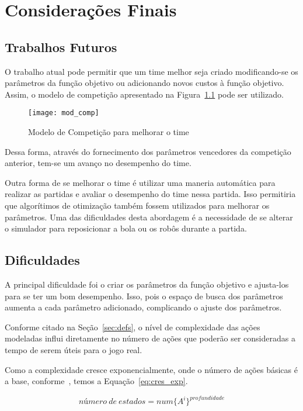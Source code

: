 \chapter{Considerações Finais}\label{cap:cons_finais}

\section{Trabalhos Futuros}

O trabalho atual pode permitir que um time melhor seja criado modificando-se os
parâmetros da função objetivo ou adicionando novos custos à função objetivo.
Assim, o modelo de competição apresentado na Figura~\ref{fig:mod_comp} pode ser
utilizado.

\begin{figure}[H]
  \centering
  \texttt{[image: mod\_comp]}
  \caption{Modelo de Competição para melhorar
           o time}\label{fig:mod_comp}
\end{figure}

Dessa forma, através do fornecimento dos parâmetros vencedores da competição
anterior, tem-se um avanço no desempenho do time.

Outra forma de se melhorar o time é utilizar uma maneria automática para
realizar as partidas e avaliar o desempenho do time nessa partida. Isso
permitiria que algorítimos de otimização também fossem utilizados para melhorar
os parâmetros.  Uma das dificuldades desta abordagem é a necessidade de se
alterar o simulador para reposicionar a bola ou os robôs durante a partida.

\section{Dificuldades}

A principal dificuldade foi o criar os parâmetros da função objetivo e
ajusta-los para se ter um bom desempenho. Isso, pois o espaço de busca dos
parâmetros aumenta a cada parâmetro adicionado, complicando o ajuste dos
parâmetros.

Conforme citado na Seção~\ref{sec:defs}, o nível de complexidade das ações
modeladas influi diretamente no número de ações que poderão ser consideradas a
tempo de serem úteis para o jogo real.

Como a complexidade cresce exponencialmente, onde o número de ações básicas é a
base, conforme~\cite{russell2003artificial}, temos a Equação~\ref{eq:cres_exp}.

\begin{dmath}\label{eq:cres_exp}
 número{\ }de{\ }estados = num \lbrace A^i \rbrace ^{profundidade}
\end{dmath}

